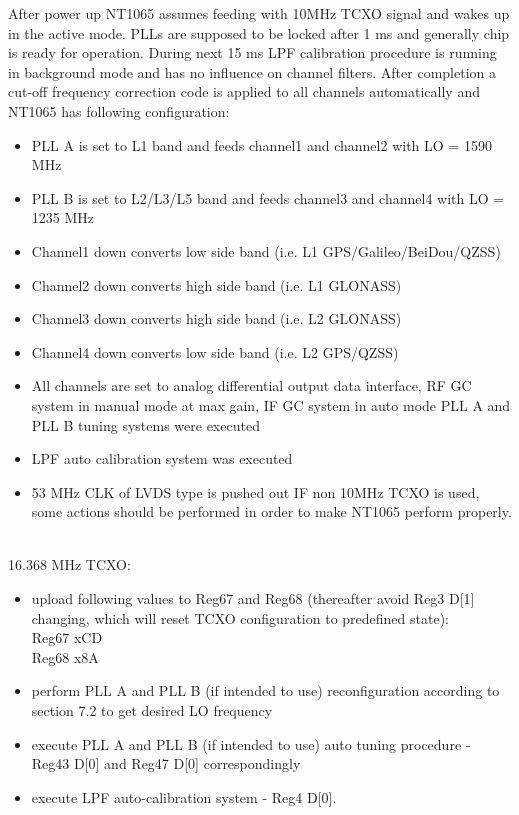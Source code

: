 \documentclass[12pt,a4paper,onecolumn]{article}
\begin{document}
After power up NT1065 assumes feeding with 10MHz TCXO signal and wakes up in the active mode. PLLs are supposed to be locked after 1 ms and generally chip is ready for operation. During next 15 ms LPF calibration procedure is running in background mode and has no influence on channel filters. After completion a cut-off frequency correction code is applied to all channels automatically and NT1065 has following configuration: 
\begin{itemize}

\item PLL A is set to L1 band and feeds channel1 and channel2 with LO = 1590 MHz  
\item PLL B is set to L2/L3/L5 band and feeds channel3 and channel4 with LO = 1235 MHz  
\item  Channel1 down converts low side band (i.e. L1 GPS/Galileo/BeiDou/QZSS) 
\item  Channel2 down converts high side band (i.e. L1 GLONASS) 
\item  Channel3 down converts high side band (i.e. L2 GLONASS) 
\item  Channel4 down converts low side band (i.e. L2 GPS/QZSS) 
\item  All channels are set to analog differential output data interface, RF GC system in manual mode at max gain, IF GC system in auto mode  PLL A and PLL B tuning systems were executed 
\item  LPF auto calibration system was executed 
\item  53 MHz CLK of LVDS type is pushed out IF non 10MHz TCXO is used, some actions should be performed in order to make NT1065 perform properly.
\end{itemize}
\\
16.368 MHz TCXO: 
\begin{itemize}
\item upload following values to Reg67 and Reg68 (thereafter avoid Reg3 D[1] changing, which will reset TCXO configuration to predefined state): 
\\ Reg67 xCD 
\\ Reg68 x8A 
\item perform PLL A and PLL B (if intended to use) reconfiguration according to section 7.2 to get desired LO frequency 
\item  execute PLL A and PLL B (if intended to use) auto tuning procedure - Reg43 D[0] and Reg47 D[0] correspondingly 
\item  execute LPF auto-calibration system - Reg4 D[0].
\end{itemize}
\newpage
\end{document}
